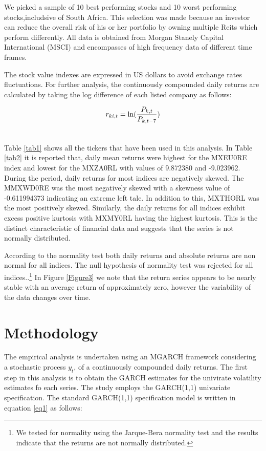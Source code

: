 \documentclass[11pt,preprint, authoryear]{elsarticle}
\numberwithin{equation}{section}
\numberwithin{figure}{section}
\numberwithin{table}{section}
\let\rmarkdownfootnote\footnote%
\def\footnote{\protect\rmarkdownfootnote}
\begin{document}
We picked a sample of 10 best performing stocks and 10 worst performing
stocks,includsive of South Africa. This selection was made because an
investor can reduce the overall risk of his or her portfolio by owning
multiple Reits which perform differently. All data is obtained from
Morgan Stanely Capital International (MSCI) and encompasses of high
frequency data of different time frames.

The stock value indexes are expressed in US dollars to avoid exchange
rates fluctuations. For further analysis, the continuously compounded
daily returns are calculated by taking the log difference of each listed
company as follows:

\begin{align} 
r_{ki,t} = \ln (\frac{P_{k,t}}{P_{k,t-7}})
\label{eq1} \\ \notag 
\end{align}

Table \ref{tab1} shows all the tickers that have been used in this
analysis. In Table \ref{tab2} it is reported that, daily mean returns
were highest for the MXEU0RE index and lowest for the MXZA0RL with
values of 9.872380 and -9.023962. During the period, daily returns for
most indices are negatively skewed. The MMXWD0RE was the most negatively
skewed with a skewness value of -0.611994373 indicating an extreme left
tale. In addition to this, MXTHORL was the most positively skewed.
Similarly, the daily returns for all indices exhibit excess positive
kurtosis with MXMY0RL having the highest kurtosis. This is the distinct
characteristic of financial data and suggests that the series is not
normally distributed.

According to the normality test both daily returns and absolute returns
are non normal for all indices. The null hypothesis of normality test
was rejected for all indices..\footnote{We tested for normality using
  the Jarque-Bera normality test and the results indicate that the
  returns are not normally distributed.} In Figure \ref{Figure3} we note
that the return series appears to be nearly stable with an average
return of approximately zero, however the variability of the data
changes over time.

\hypertarget{methodology}{%
\section{Methodology}\label{methodology}}

The empirical analysis is undertaken using an MGARCH framework
considering a stochastic process \(y_t\), of a continuously compounded
daily returns. The first step in this analysis is to obtain the GARCH
estimates for the univirate volatility estimates fo each series. The
study employs the GARCH(1,1) univariate specification. The standard
GARCH(1,1) specification model is written in equation \ref{eq1} as
follows:
\end{document}
